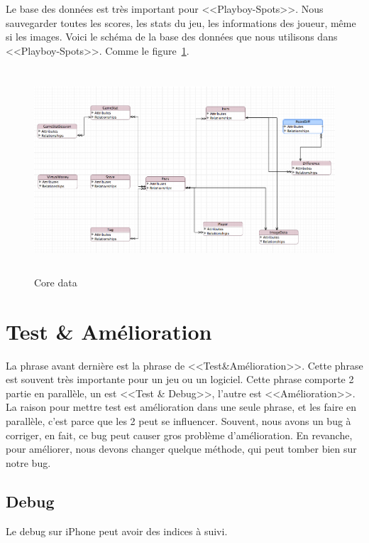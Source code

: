 Le base des données est très important pour <<Playboy-Spots>>. Nous sauvegarder toutes les scores, les stats du jeu, les informations des joueur, même si les images. 
Voici le schéma de la base des données que nous utilisons dans <<Playboy-Spots>>. Comme le figure~\ref{fig:Image_coredata}.


\begin{figure}[htbp]
	\centering
		\includegraphics[height=3in]{Image/coredata.png}
	\caption{Core data}
	\label{fig:Image_coredata}
\end{figure}




\section{Test \& Amélioration} %
\label{sec:test_&_amélioration}

La phrase avant dernière est la phrase de <<Test\&Amélioration>>. Cette phrase est souvent très importante pour un jeu ou un logiciel. Cette phrase comporte 2 partie en parallèle, un est <<Test \& Debug>>, l'autre est <<Amélioration>>. La raison pour mettre test est amélioration dans une seule phrase, et les faire en parallèle, c'est parce que les 2 peut se influencer. Souvent, nous avons un bug à corriger, en fait, ce bug peut causer gros problème d'amélioration. En revanche, pour améliorer, nous devons changer quelque méthode, qui peut tomber bien sur notre bug.

\subsection{Debug} %
\label{sub:debug}

Le debug sur iPhone peut avoir des indices à suivi. 

